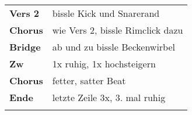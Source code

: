 
\begin{tabular}{p{1.6cm}l}
	\textbf{Vers 2} & bissle Kick und Snarerand \\
	\textbf{Chorus} & wie Vers 2, bissle Rimclick dazu \\
	\textbf{Bridge} & ab und zu bissle Beckenwirbel \\
	\textbf{Zw}     & 1x ruhig, 1x hochsteigern \\
	\textbf{Chorus} & fetter, satter Beat \\
	\textbf{Ende}   & letzte Zeile 3x, 3. mal ruhig \\
	& \\
\end{tabular}